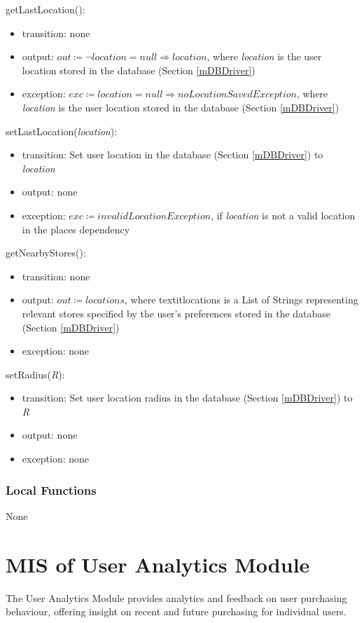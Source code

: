 \documentclass[12pt, titlepage]{article}
\begin{document}
\noindent getLastLocation():
\begin{itemize}
\item transition: none
\item output: \( \textit{out} \coloneqq \neg location = null \Rightarrow  location \), where \textit{location} is the user location stored in the database (Section \ref{mDBDriver})
\item exception: \( \textit{exc} \coloneqq location = null \Rightarrow  noLocationSavedException \), where \textit{location} is the user location stored in the database (Section \ref{mDBDriver})
\end{itemize}

\noindent setLastLocation(\textit{location}):
\begin{itemize}
\item transition: Set user location in the database (Section \ref{mDBDriver}) to \textit{location}
\item output: none
\item exception: \( \textit{exc} \coloneqq invalidLocationException \), if \textit{location} is not a valid location in the places dependency
\end{itemize}

\noindent getNearbyStores():
\begin{itemize}
\item transition: none
\item output: \( \textit{out} \coloneqq locations \), where textit{locations} is a List of Strings representing relevant stores specified by the user's preferences stored in the database (Section \ref{mDBDriver})
\item exception: none
\end{itemize}

\noindent setRadius(\textit{R}):
\begin{itemize}
\item transition: Set user location radius in the database (Section \ref{mDBDriver}) to \textit{R}
\item output: none
\item exception: none
\end{itemize}


\subsubsection{Local Functions}
None

\newpage

\section{MIS of User Analytics Module} \label{mAnalytics} 
The User Analytics Module provides analytics and feedback on user purchasing behaviour, offering insight on recent and future purchasing for individual users.
\end{document}
